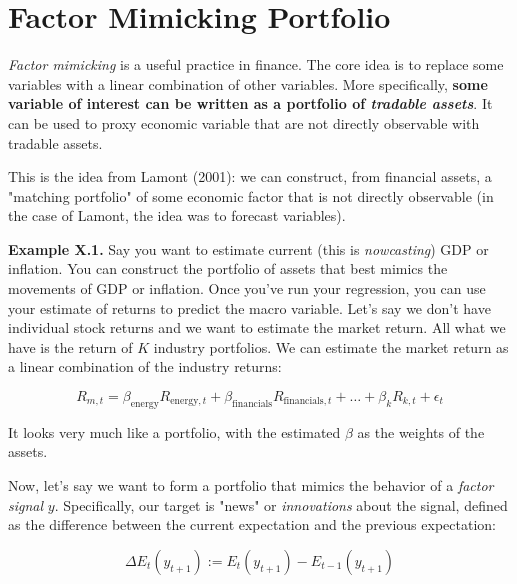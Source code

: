 \section{Factor Mimicking Portfolio}

\textit{Factor mimicking} is a useful practice in finance. 
The core idea is to replace some variables with 
a linear combination of other variables. More
specifically, \textbf{some variable of interest can be
written as a portfolio of \textit{tradable assets}}.
It can be used to proxy economic variable that 
are not directly observable with tradable assets.

This is the idea from Lamont (2001): 
we can construct, from financial assets, 
a "matching portfolio" of some economic factor
that is not directly observable (in the case of 
Lamont, the idea was to forecast variables).



\begin{examplebox}
    \textbf{Example X.1.}    
    Say you want to estimate current (this is \textit{nowcasting})
    GDP or inflation. You can construct the portfolio 
    of assets that best mimics the movements of GDP or inflation.
    Once you've run your regression, you can use your 
    estimate of returns to predict the macro variable.
    Let's say we don't have individual 
    stock returns and we want to estimate 
    the market return. All what we have is
    the return of $K$ industry portfolios. We 
    can estimate the market return as a 
    linear combination of the industry returns:
    
    \begin{equation}
    R_{m,t} = \beta_{\text{energy}} R_{\text{energy},t} + \beta_{\text{financials}} R_{\text{financials},t} + \ldots + \beta_{k} R_{k,t} + \epsilon_{t}
    \end{equation}
    
    It looks very much like a portfolio, with 
    the estimated $\beta$ as the weights of the assets.
\end{examplebox}



Now, let's say we want to form a portfolio that 
mimics the behavior of a \textit{factor signal} $y$.
Specifically, our target is "news" or \textit{innovations} about the signal,
defined as the difference between the current expectation 
and the previous expectation:

\begin{equation}
    \Delta E_t(y_{t+1}) := E_t(y_{t+1}) - E_{t-1}(y_{t+1})
\end{equation}

